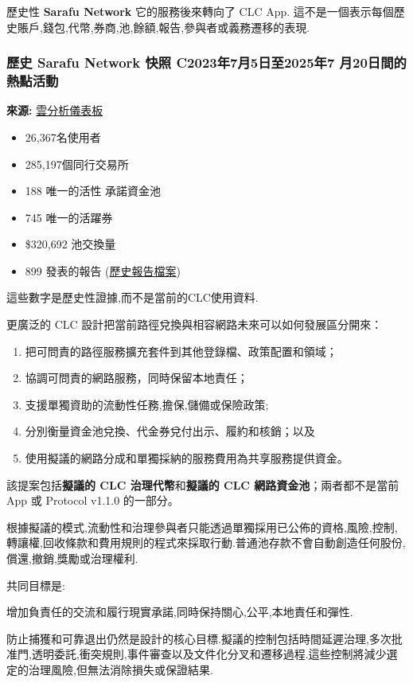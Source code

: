 \documentclass[11pt]{article}
\begin{document}
歷史性 \textbf{Sarafu Network} 它的服務後來轉向了 CLC App. 這不是一個表示每個歷史賬戶,錢包,代幣,券商,池,餘額,報告,參與者或義務遷移的表現.

\subsubsection*{歷史 Sarafu Network 快照  C2023年7月5日至2025年7 月20日間的熱點活動}

\textbf{來源:} \href{https://dune.com/grassrootseconomics/sarafu-network}{雲分析儀表板}

\begin{itemize}[leftmargin=*]
\item 26,367名使用者
\item 285,197個同行交易所
\item 188 唯一的活性 承諾資金池
\item 745 唯一的活躍券
\item \$320,692 池交換量
\item 899 發表的報告 (\href{https://sarafu.network/reports}{歷史報告檔案})
\end{itemize}
這些數字是歷史性證據,而不是當前的CLC使用資料.

更廣泛的 CLC 設計把當前路徑兌換與相容網路未來可以如何發展區分開來：

\begin{enumerate}[leftmargin=*]
\item 把可問責的路徑服務擴充套件到其他登錄檔、政策配置和領域；
\item 協調可問責的網路服務，同時保留本地責任；
\item 支援單獨資助的流動性任務,擔保,儲備或保險政策;
\item 分別衡量資金池兌換、代金券兌付出示、履約和核銷；以及
\item 使用擬議的網路分成和單獨採納的服務費用為共享服務提供資金。
\end{enumerate}
該提案包括\textbf{擬議的 CLC 治理代幣}和\textbf{擬議的 CLC 網路資金池}；兩者都不是當前 App 或 Protocol v1.1.0 的一部分。

根據擬議的模式,流動性和治理參與者只能透過單獨採用已公佈的資格,風險,控制,轉讓權,回收條款和費用規則的程式來採取行動.普通池存款不會自動創造任何股份,償還,撤銷,獎勵或治理權利.

共同目標是:

增加負責任的交流和履行現實承諾,同時保持關心,公平,本地責任和彈性.

防止捕獲和可靠退出仍然是設計的核心目標.擬議的控制包括時間延遲治理,多次批准門,透明委託,衝突規則,事件審查以及文件化分叉和遷移過程.這些控制將減少選定的治理風險,但無法消除損失或保證結果.
\end{document}

